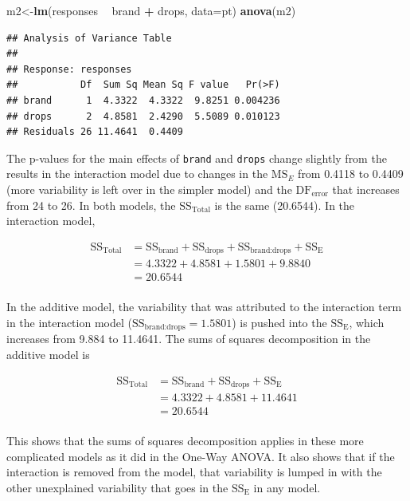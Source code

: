 \documentclass[]{book}
\newenvironment{Shaded}{\begin{snugshade}}{\end{snugshade}}
\newcommand{\KeywordTok}[1]{\textcolor[rgb]{0.13,0.29,0.53}{\textbf{#1}}}
\newcommand{\DataTypeTok}[1]{\textcolor[rgb]{0.13,0.29,0.53}{#1}}
\newcommand{\StringTok}[1]{\textcolor[rgb]{0.31,0.60,0.02}{#1}}
\newcommand{\OperatorTok}[1]{\textcolor[rgb]{0.81,0.36,0.00}{\textbf{#1}}}
\newcommand{\NormalTok}[1]{#1}
\theoremstyle{definition}
\theoremstyle{definition}
\theoremstyle{remark}
\begin{document}
\begin{Shaded}
\begin{Highlighting}[]
\NormalTok{m2<-}\KeywordTok{lm}\NormalTok{(responses }\OperatorTok{~}\StringTok{ }\NormalTok{brand }\OperatorTok{+}\StringTok{ }\NormalTok{drops, }\DataTypeTok{data=}\NormalTok{pt)}
\KeywordTok{anova}\NormalTok{(m2)}
\end{Highlighting}
\end{Shaded}

\begin{verbatim}
## Analysis of Variance Table
## 
## Response: responses
##           Df  Sum Sq Mean Sq F value   Pr(>F)
## brand      1  4.3322  4.3322  9.8251 0.004236
## drops      2  4.8581  2.4290  5.5089 0.010123
## Residuals 26 11.4641  0.4409
\end{verbatim}

The p-values for the main effects of \texttt{brand} and \texttt{drops}
change slightly from the results in the interaction model due to changes
in the \(\text{MS}_E\) from 0.4118 to 0.4409 (more variability is left
over in the simpler model) and the \(\text{DF}_{\text{error}}\) that
increases from 24 to 26. In both models, the
\(\text{SS}_{\text{Total}}\) is the same (20.6544). In the interaction
model,

\[\begin{array}{rl}
\text{SS}_{\text{Total}} & = \text{SS}_{\text{brand}} + \text{SS}_{\text{drops}}
+ \text{SS}_{\text{brand:drops}} + \text{SS}_{\text{E}}\\
& = 4.3322 + 4.8581 + 1.5801 + 9.8840\\
& = 20.6544\\
\end{array}\]

In the additive model, the variability that was attributed to the
interaction term in the interaction model
(\(\text{SS}_{\text{brand:drops}} = 1.5801\)) is pushed into the
\(\text{SS}_{\text{E}}\), which increases from 9.884 to 11.4641. The
sums of squares decomposition in the additive model is

\[\begin{array}{rl}
\text{SS}_{\text{Total}} & = \text{SS}_{\text{brand}} + \text{SS}_{\text{drops}}
 + \text{SS}_{\text{E}} \\
& = 4.3322 + 4.8581 + 11.4641 \\
& = 20.6544 \\
\end{array}\]

This shows that the sums of squares decomposition applies in these more
complicated models as it did in the One-Way ANOVA. It also shows that if
the interaction is removed from the model, that variability is lumped in
with the other unexplained variability that goes in the
\(\text{SS}_{\text{E}}\) in any model.
\end{document}
